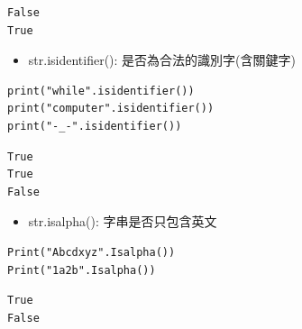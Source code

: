 \documentclass[a4paper,12pt]{article}
\begin{document}
\begin{enumerate}
\begin{verbatim}
False
True
\end{verbatim}


\begin{itemize}
\item str.isidentifier(): 是否為合法的識別字(含關鍵字)\\
\end{itemize}
\lstset{breaklines=true,language=Python,label= ,caption= ,captionpos=b,firstnumber=1,numbers=left}
\begin{lstlisting}
print("while".isidentifier())
print("computer".isidentifier())
print("-_-".isidentifier())
\end{lstlisting}

\begin{verbatim}
True
True
False
\end{verbatim}


\begin{itemize}
\item str.isalpha(): 字串是否只包含英文\\
\end{itemize}
\lstset{breaklines=true,language=Python,label= ,caption= ,captionpos=b,firstnumber=1,numbers=left}
\begin{lstlisting}
Print("Abcdxyz".Isalpha())
Print("1a2b".Isalpha())
\end{lstlisting}

\begin{verbatim}
True
False
\end{verbatim}



\end{enumerate}
\end{document}
